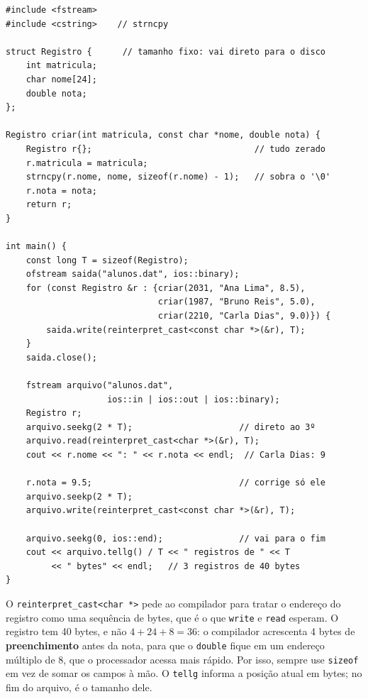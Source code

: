 \begin{codigo}
\begin{Verbatim}[breaklines=true, breaksymbolleft={}, fontsize=\footnotesize]
#include <fstream>
#include <cstring>    // strncpy

struct Registro {      // tamanho fixo: vai direto para o disco
    int matricula;
    char nome[24];
    double nota;
};

Registro criar(int matricula, const char *nome, double nota) {
    Registro r{};                                // tudo zerado
    r.matricula = matricula;
    strncpy(r.nome, nome, sizeof(r.nome) - 1);   // sobra o '\0'
    r.nota = nota;
    return r;
}

int main() {
    const long T = sizeof(Registro);
    ofstream saida("alunos.dat", ios::binary);
    for (const Registro &r : {criar(2031, "Ana Lima", 8.5),
                              criar(1987, "Bruno Reis", 5.0),
                              criar(2210, "Carla Dias", 9.0)}) {
        saida.write(reinterpret_cast<const char *>(&r), T);
    }
    saida.close();

    fstream arquivo("alunos.dat",
                    ios::in | ios::out | ios::binary);
    Registro r;
    arquivo.seekg(2 * T);                     // direto ao 3º
    arquivo.read(reinterpret_cast<char *>(&r), T);
    cout << r.nome << ": " << r.nota << endl;  // Carla Dias: 9

    r.nota = 9.5;                             // corrige só ele
    arquivo.seekp(2 * T);
    arquivo.write(reinterpret_cast<const char *>(&r), T);

    arquivo.seekg(0, ios::end);               // vai para o fim
    cout << arquivo.tellg() / T << " registros de " << T
         << " bytes" << endl;   // 3 registros de 40 bytes
}
\end{Verbatim}
\end{codigo}

O \texttt{reinterpret\_cast<char *>} pede ao compilador para tratar o endereço do registro como uma sequência de bytes, que é o que \texttt{write} e \texttt{read} esperam. O registro tem 40 bytes, e não $4 + 24 + 8 = 36$: o compilador acrescenta 4 bytes de \textbf{preenchimento} antes da nota, para que o \texttt{double} fique em um endereço múltiplo de 8, que o processador acessa mais rápido. Por isso, sempre use \texttt{sizeof} em vez de somar os campos à mão. O \texttt{tellg} informa a posição atual em bytes; no fim do arquivo, é o tamanho dele.

